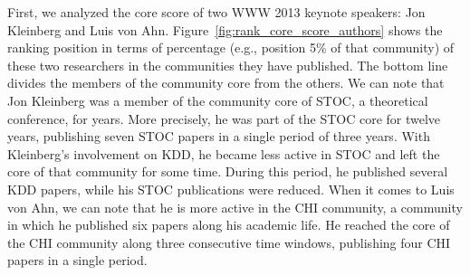 \documentclass[letterpaper]{www13-companion-accepted}
\begin{document}
First, we analyzed the core score of two WWW 2013 keynote speakers: Jon Kleinberg and Luis von Ahn.  Figure~\ref{fig:rank_core_score_authors} shows the ranking position in terms of
percentage (e.g., position 5\% of that community) of these two researchers in the communities they have published. The bottom line divides the members of the community core from the others.
We can note that Jon Kleinberg was a member of the community core of STOC, a theoretical conference, for years. More precisely, he was part of the STOC core for twelve years,
publishing seven STOC papers in a single period of three years. With Kleinberg's involvement on KDD, he became less active in STOC and left the core of that community for some time.
During this period, he published several KDD papers, while his STOC publications were reduced.  When it comes to Luis von Ahn, we can note that he is more active in
the CHI community, a community in which he published six papers along his academic life. He reached the core of the CHI community along three consecutive time windows,
publishing four CHI papers in a single period.
\end{document}

